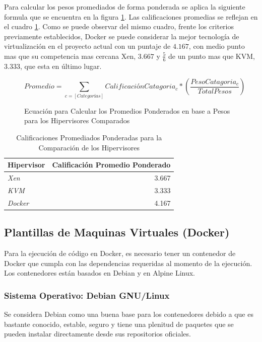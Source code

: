 Para calcular los pesos promediados de forma ponderada se aplica la siguiente formula que se encuentra en la figura \ref{fig:hipervisor-calif-equ}. Las calificaciones promedias se reflejan en el cuadro \ref{tab:hipervisor-compar-promed}. Como se puede observar del mismo cuadro, frente los criterios previamente establecidos, Docker se puede considerar la mejor tecnología de virtualización en el proyecto actual con un puntaje de $4.167$, con medio punto mas que su competencia mas cercana Xen, $3.667$ y $\frac{5}{6}$ de un punto mas que KVM, $3.333$, que esta en último lugar.

\begin{figure}
	\[
		Promedio = \sum_{c = [Categorías]} CalificaciónCatagoria_c * \left ( \frac{PesoCatagoria_c}{TotalPesos} \right )
	\]
	\caption{Ecuación para Calcular los Promedios Ponderados en base a Pesos para los Hipervisores Comparados}
    \label{fig:hipervisor-calif-equ}
\end{figure}

\begin{table}
	\centering
	\begin{tabular}{|l|r|}
    	\hline
		\textbf{Hipervisor} & \textbf{Calificación Promedio Ponderado} \\
        \hline
        \textit{Xen} & 3.667 \\
        \hline
        \textit{KVM} & 3.333 \\
        \hline
        \textit{Docker} & 4.167 \\
        \hline
	\end{tabular}
    \caption{Calificaciones Promediados Ponderadas para la Comparación de los Hipervisores}
    \label{tab:hipervisor-compar-promed}
\end{table}

\subsection{Plantillas de Maquinas Virtuales (Docker)}
Para la ejecución de código en Docker, es necesario tener un contenedor de Docker que cumpla con las dependencias requeridas al momento de la ejecución. Los contenedores están basados en Debian y en Alpine Linux.

\subsubsection{Sistema Operativo: Debian GNU/Linux}
Se considera Debian como una buena base para los contenedores debido a que es bastante conocido, estable, seguro y tiene una plenitud de paquetes que se pueden instalar directamente desde sus repositorios oficiales.


